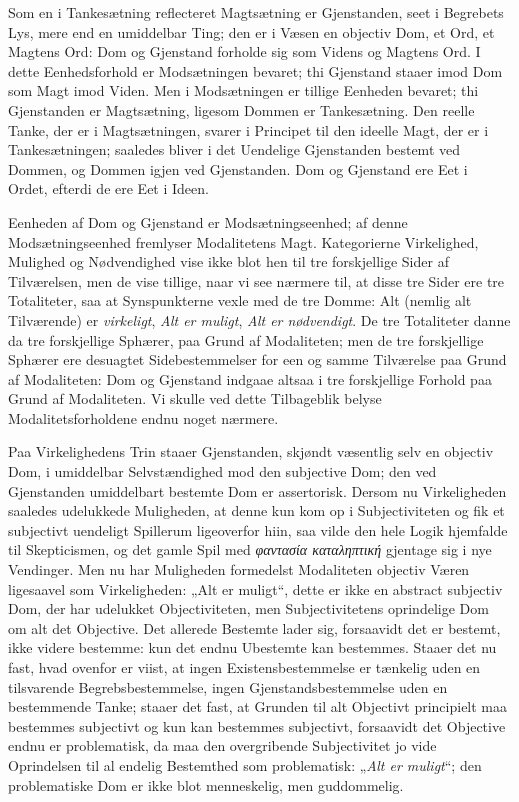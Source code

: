 \documentclass[12pt]{book}
\newcommand{\opage}[1]{\marginnote{\footnotesize\textit{[#1]}}}
\begin{document}
Som en i Tankesætning reflecteret Magtsætning er Gjenstanden,
seet i Begrebets Lys, mere end en umiddelbar Ting;
den er i Væsen en objectiv Dom, et Ord, et Magtens Ord:
Dom og Gjenstand forholde sig som Videns og Magtens
Ord. I dette Eenhedsforhold er Modsætningen bevaret; thi
Gjenstand staaer imod Dom som Magt imod Viden. Men
i Modsætningen er tillige Eenheden bevaret; thi Gjenstanden
er Magtsætning, ligesom Dommen er Tankesætning. Den
reelle Tanke, der er i Magtsætningen, svarer i Principet til
den ideelle Magt, der er i Tankesætningen; saaledes bliver i
det Uendelige Gjenstanden bestemt ved Dommen, og Dommen
igjen ved Gjenstanden. Dom og Gjenstand ere Eet i Ordet,
efterdi de ere Eet i Ideen.

Eenheden af Dom og Gjenstand er Modsætningseenhed;
af denne Modsætningseenhed fremlyser Modalitetens Magt.
Kategorierne Virkelighed, Mulighed og Nødvendighed vise ikke
blot hen til tre forskjellige Sider af Tilværelsen, men de vise
tillige, naar vi see nærmere til, at disse tre Sider ere tre
Totaliteter, saa at Synspunkterne vexle med de tre Domme:
Alt (nemlig alt Tilværende) er \emph{virkeligt}, \emph{Alt er muligt},
\emph{Alt er nødvendigt}. De tre Totaliteter danne da tre forskjellige
Sphærer, paa Grund af Modaliteten; men de tre
forskjellige Sphærer ere desuagtet Sidebestemmelser for een og
samme Tilværelse paa Grund af Modaliteten: Dom og
Gjenstand indgaae altsaa i tre forskjellige Forhold paa Grund
af Modaliteten. Vi skulle ved dette Tilbageblik belyse Modalitetsforholdene
endnu noget nærmere.

\opage{289}Paa Virkelighedens Trin staaer Gjenstanden, skjøndt
væsentlig selv en objectiv Dom, i umiddelbar Selvstændighed
mod den subjective Dom; den ved Gjenstanden umiddelbart
bestemte Dom er assertorisk. Dersom nu Virkeligheden saaledes
udelukkede Muligheden, at denne kun kom op i Subjectiviteten
og fik et subjectivt uendeligt Spillerum ligeoverfor
hiin, saa vilde den hele Logik hjemfalde til Skepticismen, og
det gamle Spil med \textit{φαντασία καταληπτική} gjentage sig i
nye Vendinger. Men nu har Muligheden formedelst Modaliteten
objectiv Væren ligesaavel som Virkeligheden: „Alt er
muligt“, dette er ikke en abstract subjectiv Dom, der har udelukket
Objectiviteten, men Subjectivitetens oprindelige Dom
om alt det Objective. Det allerede Bestemte lader sig, forsaavidt
det er bestemt, ikke videre bestemme: kun det endnu Ubestemte
kan bestemmes. Staaer det nu fast, hvad ovenfor er viist, at
ingen Existensbestemmelse er tænkelig uden en tilsvarende Begrebsbestemmelse,
ingen Gjenstandsbestemmelse uden en bestemmende
Tanke; staaer det fast, at Grunden til alt Objectivt principielt
maa bestemmes subjectivt og kun kan bestemmes subjectivt,
forsaavidt det Objective endnu er problematisk, da maa
den overgribende Subjectivitet jo vide Oprindelsen til al endelig
Bestemthed som problematisk: „\emph{Alt er muligt}“; den problematiske
Dom er ikke blot menneskelig, men guddommelig.
\end{document}
